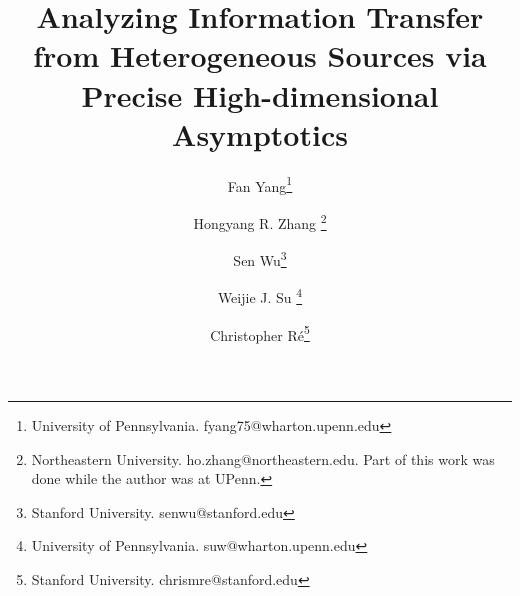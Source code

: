 \documentclass{article}
\begin{document}
	\title{Analyzing Information Transfer from Heterogeneous Sources via Precise High-dimensional Asymptotics}
	
    \author{Fan Yang\thanks{University of Pennsylvania. fyang75@wharton.upenn.edu}\and Hongyang R. Zhang \thanks{Northeastern University. ho.zhang@northeastern.edu. Part of this work was done while the author was at UPenn.}\and Sen Wu\thanks{Stanford University. senwu@stanford.edu}\and Weijie J. Su \thanks{University of Pennsylvania. suw@wharton.upenn.edu}\and Christopher R\'e\thanks{Stanford University. chrismre@stanford.edu}}

	\maketitle
	
	
	
	
    
	
	
	
	
\end{document}
